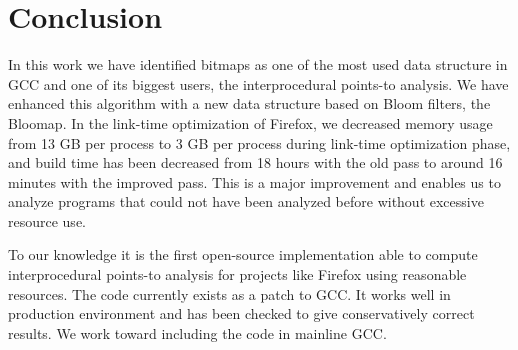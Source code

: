 \chapter*{Conclusion}

In this work we have identified bitmaps as one of the most used data
structure in GCC and one of its biggest users, the interprocedural
points-to analysis. We have enhanced this algorithm with a new data structure
based on Bloom filters, the Bloomap. In the link-time optimization of Firefox,
we decreased memory usage from 13 GB per process to 3 GB per process during
link-time optimization phase, and build time  has been decreased from 18 hours
with the old pass to around 16 minutes with the improved pass. This is a major
improvement and enables us to analyze programs that could not have been
analyzed before without excessive resource use.

To our knowledge it is the first open-source implementation able to compute
interprocedural points-to analysis for projects like Firefox using reasonable
resources.  The code currently exists as a patch to GCC. It works well in
production environment and has been checked to give conservatively correct
results. We work toward including the code in mainline GCC.
